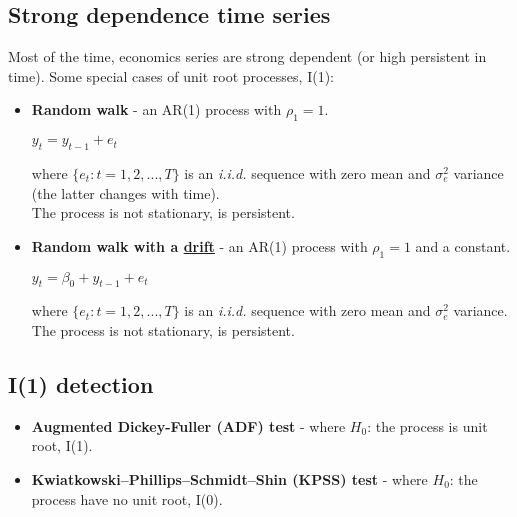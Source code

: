 \documentclass[10pt, a4paper, landscape]{extarticle}
\begin{document}
\begin{multicols}{3}
\section*{Strong dependence time series}
	Most of the time, economics series are strong dependent (or high persistent in time). Some special cases of unit root processes, I(1):
	\begin{itemize}[leftmargin=*]
		\item \textbf{Random walk} - an AR(1) process with $\rho_1 = 1$.
		\begin{center}
			$y_t = y_{t-1} + e_t$
		\end{center}
		where $\lbrace e_t : t = 1, 2, ..., T \rbrace$ is an \textsl{i.i.d.} sequence with zero mean and $\sigma^2_e$ variance (the latter changes with time). \\
		The process is not stationary, is persistent.
		\item \textbf{Random walk with a \href{https://www.youtube.com/watch?v=pS5d77DQHOI}{drift}} - an AR(1) process with $\rho_1 = 1$ and a constant.
		\begin{center}
			$y_t = \beta_0 + y_{t-1} + e_t$
		\end{center}
		where $\lbrace e_t : t = 1, 2, ..., T \rbrace$ is an \textsl{i.i.d.} sequence with zero mean and $\sigma^2_e$ variance. \\
		The process is not stationary, is persistent.
	\end{itemize}
	\subsection*{I(1) detection}
		\begin{itemize}[leftmargin=*]
			\item \textbf{Augmented Dickey-Fuller (ADF) test} - where $H_0$: the process is unit root, I(1).
			\item \textbf{Kwiatkowski–Phillips–Schmidt–Shin (KPSS) test} - where $H_0$: the process have no unit root, I(0).
		\end{itemize}

\end{multicols}
\end{document}
